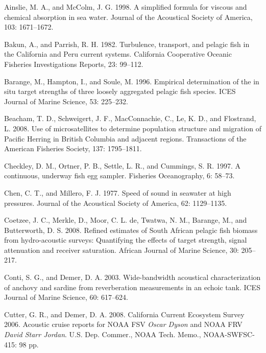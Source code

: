 \documentclass[]{article}
\begin{document}
\hypertarget{refs}{}
\leavevmode\hypertarget{ref-Ainslie1998}{}%
Ainslie, M. A., and McColm, J. G. 1998. A simplified formula for viscous and chemical absorption in sea water. Journal of the Acoustical Society of America, 103: 1671--1672.

\leavevmode\hypertarget{ref-Bakun1982}{}%
Bakun, A., and Parrish, R. H. 1982. Turbulence, transport, and pelagic fish in the California and Peru current systems. California Cooperative Oceanic Fisheries Investigations Reports, 23: 99--112.

\leavevmode\hypertarget{ref-Barange1996}{}%
Barange, M., Hampton, I., and Soule, M. 1996. Empirical determination of the in situ target strengths of three loosely aggregated pelagic fish species. ICES Journal of Marine Science, 53: 225--232.

\leavevmode\hypertarget{ref-Beacham2008}{}%
Beacham, T. D., Schweigert, J. F., MacConnachie, C., Le, K. D., and Flostrand, L. 2008. Use of microsatellites to determine population structure and migration of Pacific Herring in British Columbia and adjacent regions. Transactions of the American Fisheries Society, 137: 1795--1811.

\leavevmode\hypertarget{ref-Checkley1997}{}%
Checkley, D. M., Ortner, P. B., Settle, L. R., and Cummings, S. R. 1997. A continuous, underway fish egg sampler. Fisheries Oceanography, 6: 58--73.

\leavevmode\hypertarget{ref-Chen1977}{}%
Chen, C. T., and Millero, F. J. 1977. Speed of sound in seawater at high pressures. Journal of the Acoustical Society of America, 62: 1129--1135.

\leavevmode\hypertarget{ref-Coetzee2008}{}%
Coetzee, J. C., Merkle, D., Moor, C. L. de, Twatwa, N. M., Barange, M., and Butterworth, D. S. 2008. Refined estimates of South African pelagic fish biomass from hydro-acoustic surveys: Quantifying the effects of target strength, signal attenuation and receiver saturation. African Journal of Marine Science, 30: 205--217.

\leavevmode\hypertarget{ref-Conti2003}{}%
Conti, S. G., and Demer, D. A. 2003. Wide-bandwidth acoustical characterization of anchovy and sardine from reverberation measurements in an echoic tank. ICES Journal of Marine Science, 60: 617--624.

\leavevmode\hypertarget{ref-Cutter2008}{}%
Cutter, G. R., and Demer, D. A. 2008. California Current Ecosystem Survey 2006. Acoustic cruise reports for NOAA FSV \emph{Oscar Dyson} and NOAA FRV \emph{David Starr Jordan}. U.S. Dep. Commer., NOAA Tech. Memo., NOAA-SWFSC-415: 98 pp.
\end{document}
